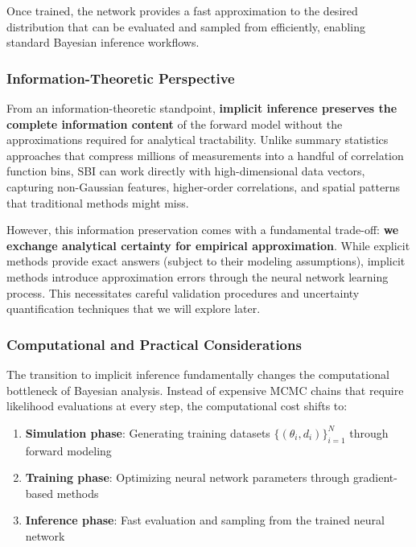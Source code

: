 \documentclass[11pt,a4paper]{article}
\theoremstyle{definition}
\begin{document}
Once trained, the network provides a fast approximation to the desired distribution that can be evaluated and sampled from efficiently, enabling standard Bayesian inference workflows.

\subsubsection{Information-Theoretic Perspective}

From an information-theoretic standpoint, \textbf{implicit inference preserves the complete information content} of the forward model without the approximations required for analytical tractability. Unlike summary statistics approaches that compress millions of measurements into a handful of correlation function bins, SBI can work directly with high-dimensional data vectors, capturing non-Gaussian features, higher-order correlations, and spatial patterns that traditional methods might miss.

However, this information preservation comes with a fundamental trade-off: \textbf{we exchange analytical certainty for empirical approximation}. While explicit methods provide exact answers (subject to their modeling assumptions), implicit methods introduce approximation errors through the neural network learning process. This necessitates careful validation procedures and uncertainty quantification techniques that we will explore later.

\subsubsection{Computational and Practical Considerations}

The transition to implicit inference fundamentally changes the computational bottleneck of Bayesian analysis. Instead of expensive MCMC chains that require likelihood evaluations at every step, the computational cost shifts to:

\begin{enumerate}
    \item \textbf{Simulation phase}: Generating training datasets $\{(\theta_i, d_i)\}_{i=1}^N$ through forward modeling
    \item \textbf{Training phase}: Optimizing neural network parameters through gradient-based methods
    \item \textbf{Inference phase}: Fast evaluation and sampling from the trained neural network
\end{enumerate}
\end{document}
